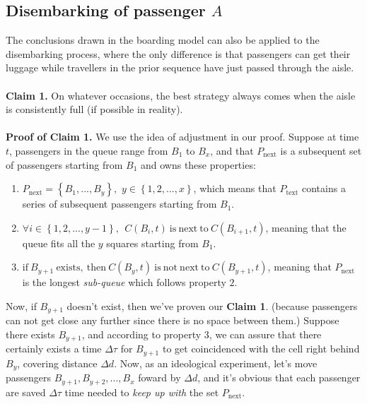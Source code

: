 \documentclass{article}
\theoremstyle{definition}
\theoremstyle{remark}
\numberwithin{equation}{section}
\begin{document}
	\subsection{Disembarking of passenger $A$}
	The conclusions drawn in the boarding model can also be applied to the disembarking process, where the only difference is that passengers can get their luggage while travellers in the prior sequence have just passed through the aisle.
	\\ \\
	\textbf{Claim 1.} On whatever occasions, the best strategy always comes when the aisle is consistently full (if possible in reality).
	\\ \\
	\textbf{Proof of Claim 1.} We use the idea of adjustment in our proof. Suppose at time \(t\), passengers in the queue range from \(B_1\) to \(B_x\), and that \(P_\mathrm{next}\) is a subsequent set of passengers starting from \(B_1\) and owns these properties:
	\begin{enumerate}
		\item \(P_{\mathrm{next}}=\left\{ B_1,...,B_y \right\} ,\,\,y\in \left\{ 1,2,...,x \right\} \), which means that \(P_{\mathrm{text}}\) contains a series of subsequent passengers starting from \(B_1\).
		\item \(\forall i\in \left\{ 1,2,...,y-1 \right\} ,\:\:C\left( B_i,t \right) \:\mathrm{is}\:\mathrm{next}\:\mathrm{to}\:C\left( B_{i+1},t \right) \), meaning that the queue fits all the \(y\) squares starting from \(B_1\).
		\item \(\mathrm{if}\:B_{y+1}\:\mathrm{exists},\:\mathrm{then}\:C\left( B_y,t \right) \:\mathrm{is}\:\mathrm{not}\:\mathrm{next}\:\mathrm{to}\:C\left( B_{y+1},t \right) \), meaning that \(P_{\mathrm{next}}\) is the longest \textit{sub-queue} which follows property \(2\).
	\end{enumerate}

	Now, if \(B_{y+1}\) doesn't exist, then we've proven our \textbf{Claim 1}. (because passengers can not get close any further since there is no space between them.) Suppose there exists \(B_{y+1}\), and according to property \(3\), we can assure that there certainly exists a time $\Delta\tau$ for \(B_{y+1}\) to get coincidenced with the cell right behind \(B_y\), covering distance \(\Delta d\). Now, as an ideological experiment, let's move passengers \(B_{y+1},B_{y+2},...,B_x\) foward by \(\Delta d\), and it's obvious that each passenger are saved \(\Delta \tau\) time needed to \textit{keep up with} the set \(P_{\mathrm{next}}\).
\end{document}
